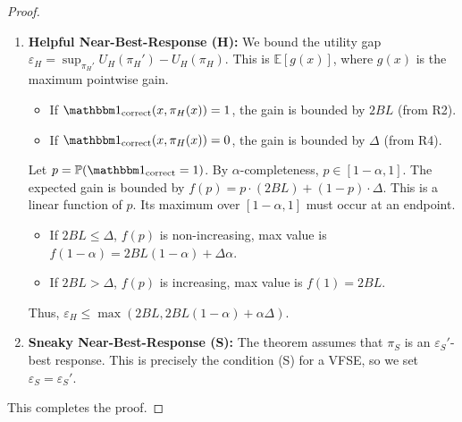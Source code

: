 \begin{proof}
\begin{enumerate}
\item  \textbf{Helpful Near-Best-Response (H):} We bound the utility gap $\varepsilon_H = \sup_{\pi_H'} U_H(\pi_H') - U_H(\pi_H)$. This is $\mathbb{E}[g(x)]$, where $g(x)$ is the maximum pointwise gain.
    \begin{itemize}
        \item If $\corr(x, \pi_H(x)) = 1$, the gain is bounded by $2BL$ (from R2).
        \item If $\corr(x, \pi_H(x)) = 0$, the gain is bounded by $\Delta$ (from R4).
    \end{itemize}
    Let $p = \mathbb{P}(\corr=1)$. By $\alpha$-completeness, $p \in [1-\alpha, 1]$. The expected gain is bounded by $f(p) = p \cdot (2BL) + (1-p) \cdot \Delta$. This is a linear function of $p$. Its maximum over $[1-\alpha, 1]$ must occur at an endpoint.
    \begin{itemize}
        \item If $2BL \le \Delta$, $f(p)$ is non-increasing, max value is $f(1-\alpha) = 2BL(1-\alpha) + \Delta\alpha$.
        \item If $2BL > \Delta$, $f(p)$ is increasing, max value is $f(1) = 2BL$.
    \end{itemize}
    Thus, $\varepsilon_H \le \max(2BL, 2BL(1-\alpha) + \alpha\Delta)$.

\item  \textbf{Sneaky Near-Best-Response (S):} The theorem assumes that $\pi_S$ is an $\varepsilon_S'$-best response. This is precisely the condition (S) for a VFSE, so we set $\varepsilon_S = \varepsilon_S'$.
\end{enumerate}
This completes the proof.
\end{proof}